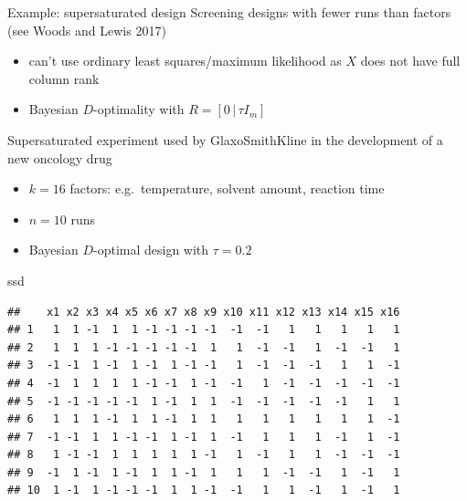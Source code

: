 \documentclass[
  ignorenonframetext,
]{beamer}
\newenvironment{Shaded}{\begin{snugshade}}{\end{snugshade}}
\newcommand{\NormalTok}[1]{#1}
\providecommand{\tightlist}{%
  \setlength{\itemsep}{0pt}\setlength{\parskip}{0pt}}
\begin{document}
\begin{frame}{Example: supersaturated design}
\protect\hypertarget{example-supersaturated-design}{}
Screening designs with fewer runs than factors (see Woods and Lewis
2017)

\begin{itemize}
\tightlist
\item
  can't use ordinary least squares/maximum likelihood as \(X\) does not
  have full column rank
\item
  Bayesian \(D\)-optimality with \(R = [0\,|\, \tau I_m]\)
\end{itemize}

Supersaturated experiment used by GlaxoSmithKline in the development of
a new oncology drug

\begin{itemize}
\tightlist
\item
  \(k=16\) factors: e.g.~temperature, solvent amount, reaction time
\item
  \(n=10\) runs
\item
  Bayesian \(D\)-optimal design with \(\tau = 0.2\)
\end{itemize}
\end{frame}

\begin{frame}[fragile]{}
\protect\hypertarget{section-18}{}
\begin{Shaded}
\begin{Highlighting}[]
\NormalTok{ssd}
\end{Highlighting}
\end{Shaded}

\begin{verbatim}
##    x1 x2 x3 x4 x5 x6 x7 x8 x9 x10 x11 x12 x13 x14 x15 x16
## 1   1  1 -1  1  1 -1 -1 -1 -1  -1  -1   1   1   1   1   1
## 2   1  1  1 -1 -1 -1 -1 -1  1   1  -1  -1   1  -1  -1   1
## 3  -1 -1  1 -1  1 -1  1 -1 -1   1  -1  -1  -1   1   1  -1
## 4  -1  1  1  1  1 -1 -1  1 -1  -1   1  -1  -1  -1  -1  -1
## 5  -1 -1 -1 -1 -1  1 -1  1  1  -1  -1  -1  -1  -1   1   1
## 6   1  1  1 -1  1  1 -1  1  1   1   1   1   1   1   1  -1
## 7  -1 -1  1  1 -1 -1  1 -1  1  -1   1   1   1  -1   1  -1
## 8   1 -1 -1  1  1  1  1  1 -1   1  -1   1   1  -1  -1  -1
## 9  -1  1 -1  1 -1  1  1 -1  1   1   1  -1  -1   1  -1   1
## 10  1 -1  1 -1 -1 -1  1  1 -1  -1   1   1  -1   1  -1   1
\end{verbatim}
\end{frame}
\end{document}
